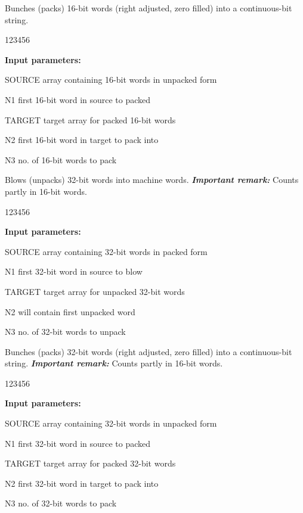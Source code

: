  
Bunches (packs) 16-bit words (right adjusted, zero filled)
into a continuous-bit string.

\begin{DLtt}{123456}
\item[{\rm\bf Input parameters:}]
\item[SOURCE] array containing 16-bit words in unpacked form
\item[N1]     first 16-bit word in source to packed
\item[TARGET] target array for packed 16-bit words
\item[N2]     first 16-bit word in target to pack into
\item[N3]     no. of 16-bit words to pack
\end{DLtt}

 
Blows (unpacks) 32-bit words into machine words.
{\bf\it Important remark:} Counts partly in 16-bit words.

\begin{DLtt}{123456}
\item[{\rm\bf Input parameters:}]
\item[SOURCE] array containing 32-bit words in packed form
\item[N1]     first 32-bit word in source to blow
\item[TARGET] target array for unpacked 32-bit words
\item[N2]      will contain first unpacked word
\item[N3]     no. of 32-bit words to unpack
\end{DLtt}

 
Bunches (packs) 32-bit words (right adjusted, zero filled)
into a continuous-bit string.
{\bf\it Important remark:} Counts partly in 16-bit words.

\begin{DLtt}{123456}
\item[{\rm\bf Input parameters:}]
\item[SOURCE] array containing 32-bit words in unpacked form
\item[N1]     first 32-bit word in source to packed
\item[TARGET] target array for packed 32-bit words
\item[N2]     first 32-bit word in target to pack into
\item[N3]     no. of 32-bit words to pack
\end{DLtt}

